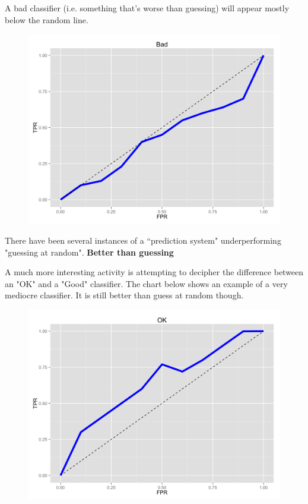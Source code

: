 \documentclass[SKL-MASTER.tex]{subfiles}
\begin{document}
\noindent A bad classifier (i.e. something that's worse than guessing) will appear mostly below the random line. 

\begin{figure}[h!]
\centering
\includegraphics[width=0.9\linewidth]{images/roc-bad}
\end{figure}

\noindent There have been several instances of a ``prediction system" underperforming "guessing at random".
\newpage
\noindent \textbf{Better than guessing}



\noindent A much more interesting activity is attempting to decipher the difference between an "OK" and a "Good" classifier. The chart below shows an example of a very mediocre classifier. It is still better than guess at random though.

\begin{figure}[h!]
\centering
\includegraphics[width=0.9\linewidth]{images/roc-ok}
\end{figure}
%
%
\end{document}
